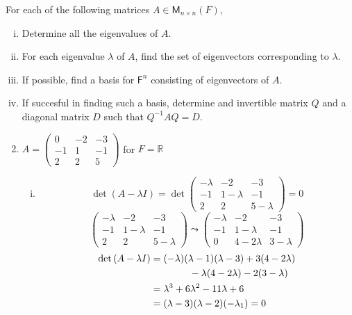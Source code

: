 For each of the following matrices $A \in \mathsf{M}_{n\times n}(F)$,
\begin{enumerate}[(i)]
\item Determine all the eigenvalues of $A$.
\item For each eigenvalue $\lambda$ of $A$, find the set of
  eigenvectors corresponding to $\lambda$.
\item If possible, find a basis for $\mathsf{F}^n$ consisting of
  eigenvectors of $A$.
\item If succesful in finding such a basis, determine and invertible
  matrix $Q$ and a diagonal matrix $D$ such that $Q^{-1}AQ = D$.
\end{enumerate}
\begin{enumerate}
\setcounter{enumii}{1}
\item $A = \begin{pmatrix}0&-2&-3\\-1&1&-1\\2&2&5
  \end{pmatrix}$ for $F=\mathbb{R}$
\begin{enumerate}[(i)]
\item 
\begin{equation}
\det{(A-\lambda I)} = \det{\begin{pmatrix}
-\lambda & -2 & -3\\
-1 & 1-\lambda & -1\\
2 & 2 & 5-\lambda
  \end{pmatrix}}=0
\end{equation}
\begin{equation}
\begin{pmatrix}
-\lambda & -2 & -3\\
-1 & 1-\lambda & -1\\
2 & 2 & 5-\lambda
  \end{pmatrix}
\leadsto
\begin{pmatrix}
-\lambda & -2 & -3\\
-1 & 1-\lambda & -1\\
0 & 4-2\lambda & 3-\lambda
  \end{pmatrix}
\end{equation}
\begin{align}
\det{(A-\lambda I)}
&= (-\lambda)(\lambda-1)(\lambda-3) + 3(4-2\lambda)\\\notag
&\qquad {} \qquad {} - \lambda(4-2\lambda) -2(3-\lambda)\\
&=\lambda^3+6\lambda^2-11\lambda+6\\
&=(\lambda-3)(\lambda-2)(-\lambda_1)=0

\end{align}
\end{enumerate}
\end{enumerate}
